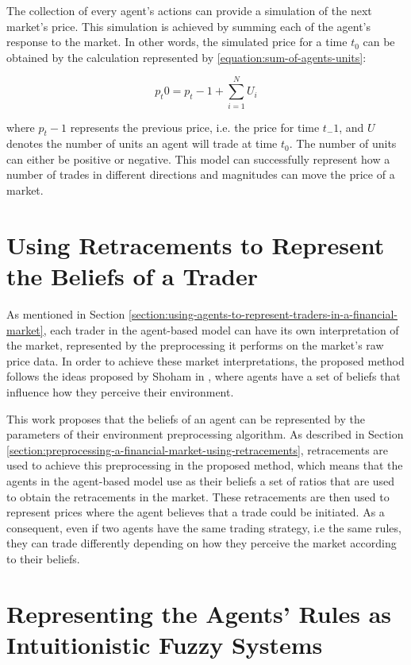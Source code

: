 The collection of every agent's actions can provide a simulation of the next
market's price. This simulation is achieved by summing each of the agent's
response to the market. In other words, the simulated price for a time $t_0$ can
be obtained by the calculation represented by \ref{equation:sum-of-agents-units}:

\begin{equation}
  \label{equation:sum-of-agents-units}
  p_t0 = p_t-1 + \sum_{i=1}^{N} U_i
\end{equation}

where $p_t-1$ represents the previous price, i.e. the price for time $t_-1$, and
$U$ denotes the number of units an agent will trade at time $t_0$. The number of
units can either be positive or negative. This model can successfully represent
how a number of trades in different directions and magnitudes can move the price
of a market.

\section{Using Retracements to Represent the Beliefs of a Trader}
\label{section:using-retracements-to-represent-the-beliefs-of-a-trader}

As mentioned in Section
\ref{section:using-agents-to-represent-traders-in-a-financial-market}, each
trader in the agent-based model can have its own interpretation of the market,
represented by the preprocessing it performs on the market's raw price data. In
order to achieve these market interpretations, the proposed method follows the
ideas proposed by Shoham in \cite{Shoham1993}, where agents have a set of
beliefs that influence how they perceive their environment.

This work proposes that the beliefs of an agent can be represented by the
parameters of their environment preprocessing algorithm. As described in Section
\ref{section:preprocessing-a-financial-market-using-retracements}, retracements
are used to achieve this preprocessing in the proposed method, which means that
the agents in the agent-based model use as their beliefs a set of ratios that
are used to obtain the retracements in the market. These retracements are then
used to represent prices where the agent believes that a trade could be
initiated. As a consequent, even if two agents have the same trading strategy,
i.e the same rules, they can trade differently depending on how they perceive
the market according to their beliefs.

\section{Representing the Agents' Rules as Intuitionistic Fuzzy Systems}
\label{section:representing-the-agents-rules-as-intuitionistic-fuzzy-systems}

